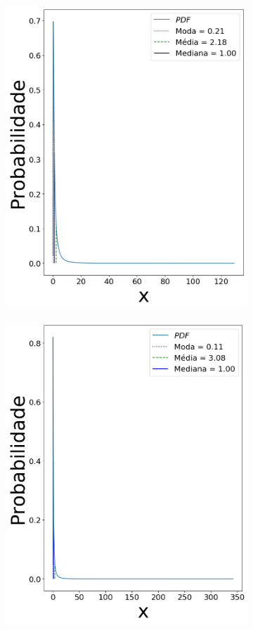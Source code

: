 \begin{figure}[H]
\begin{subfigure}[b]{0.3\textwidth}
		\includegraphics[width=\textwidth]{./figuras/log_sigma_125}
		\caption{}
		\label{fig:sig125}
	\end{subfigure}
	\hfill
	\begin{subfigure}[b]{0.3\textwidth}
		\centering 
		\includegraphics[width=\textwidth]{./figuras/log_sigma_15}

\end{subfigure}
\end{figure}
